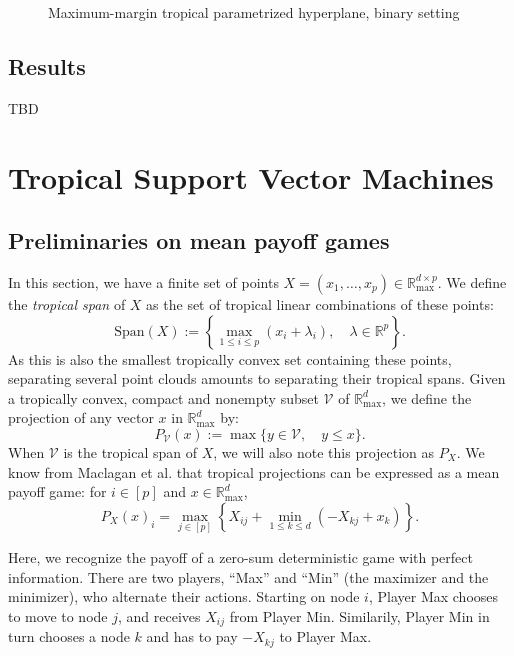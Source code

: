 \documentclass[oneside,english,a4paper]{amsart}
\numberwithin{equation}{section}
\numberwithin{figure}{section}
\theoremstyle{plain}
\theoremstyle{definition}
\theoremstyle{plain}
\theoremstyle{remark}
\theoremstyle{plain}
\theoremstyle{definition}
\theoremstyle{definition}
\begin{document}
\begin{figure}

\label{fig:MaxMargin}
\caption{Maximum-margin tropical parametrized hyperplane, binary setting}
\end{figure}


\subsection*{Results}

TBD

\section{Tropical Support Vector Machines}\label{Sec2}

\subsection{Preliminaries on mean payoff games}

In this section, we have a finite set of points $X=(x_{1},\ldots,x_{p})\in\mathbb{R}_{\text{max}}^{d\times p}$.
We define the \emph{tropical span} of $X$ as the set of tropical
linear combinations of these points:
\[
\text{Span}(X):=\left\{\max_{1\le i\le p}(x_{i}+\lambda_{i}),\quad\lambda\in\mathbb{R}^{p}\right\}.
\]
As this is also the smallest tropically convex set containing these
points, separating several point clouds amounts to separating their
tropical spans. Given a tropically convex, compact and nonempty subset $\mathcal{V}$
of $\mathbb{R}_{\max}^{d}$, we define the projection of any vector
$x$ in $\mathbb{R}_{\max}^{d}$ by:
\[
P_{\mathcal{V}}(x):=\max\{y\in \mathcal{V},\quad y\le x\}.
\]
When $\mathcal{V}$ is the tropical span of $X$, we will also note
this projection as $P_{X}$. We know from Maclagan et al. \cite{Maclagan2015} that tropical projections
can be expressed as a mean payoff game: for $i\in[p]$ and $x\in\mathbb{R}_{\max}^{d}$,
\begin{equation}
P_{X}(x)_{i}=\max_{j\in[p]}\left\{X_{ij}+\min_{1\le k \le d}(-X_{kj}+x_{k})\right\}.\label{eq:projector}
\end{equation}

Here, we recognize the payoff of a zero-sum deterministic game with perfect
information. There are two players, ``Max'' and ``Min'' (the maximizer
and the minimizer), who alternate their actions. Starting on node
$i$, Player Max chooses to move to node $j$, and receives $X_{ij}$
from Player Min. Similarily, Player Min in turn chooses a node $k$
and has to pay $-X_{kj}$ to Player Max.
\end{document}

